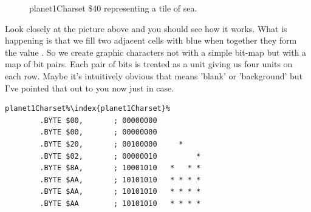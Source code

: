 \begin{figure}[H]
{\begin{adjustbox}{width=4cm,center}
    \end{adjustbox}
  }\caption{planet1Charset \$40 representing a tile of sea.}
\end{figure}

Look closely at the picture above and you should see how it works. What is happening is that we fill
two adjacent cells with blue when together they form the value . So
we create graphic characters not with a simple bit-map but with a map of bit pairs. Each pair of bits is treated as a
unit giving us four units on each row. Maybe it's intuitively obvious that 
means 'blank' or 'background' but I've pointed that out to you now just in case.

\lstset{style=6502Style}
\begin{lstlisting}[escapechar=\%,caption=Character \icode{\$40} representing the sea as it is defined in the source code. A full eight bytes are required
to define each character\index{character}\, so not cheap.]
planet1Charset%\index{planet1Charset}%
        .BYTE $00,       ; 00000000           
        .BYTE $00,       ; 00000000           
        .BYTE $20,       ; 00100000     *     
        .BYTE $02,       ; 00000010         * 
        .BYTE $8A,       ; 10001010   *   * * 
        .BYTE $AA,       ; 10101010   * * * * 
        .BYTE $AA,       ; 10101010   * * * * 
        .BYTE $AA        ; 10101010   * * * * 
\end{lstlisting}

